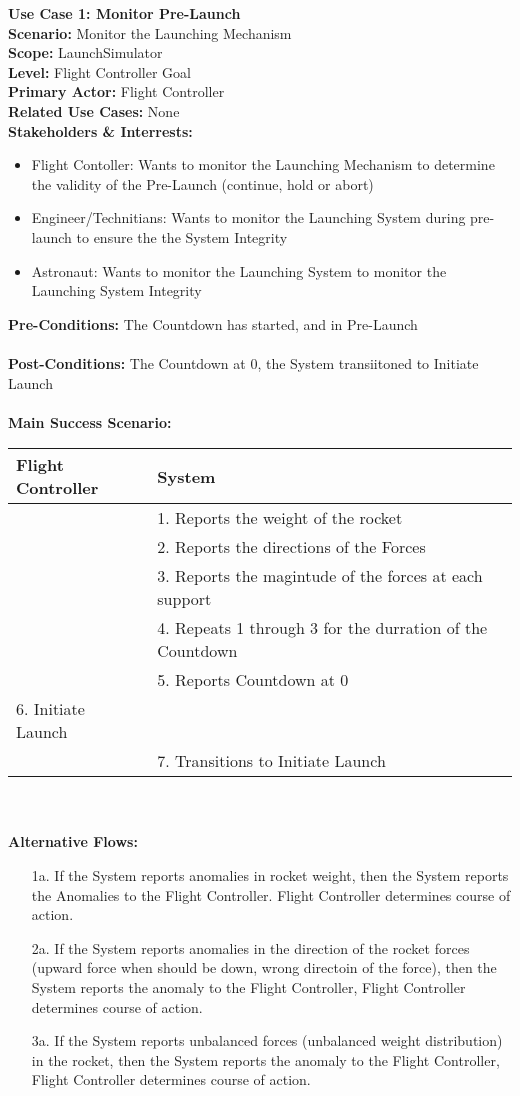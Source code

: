 \documentclass[letterpaper]{article}
\begin{document}
\noindent
\textbf{Use Case 1:  Monitor Pre-Launch}\\
\textbf{Scenario:  }Monitor the Launching Mechanism\\
\textbf{Scope:  }LaunchSimulator\\
\textbf{Level:  }Flight Controller Goal\\
\textbf{Primary Actor:  }Flight Controller\\
\textbf{Related Use Cases:  }None\\
\textbf{Stakeholders \& Interrests:}
\begin{itemize}
\item Flight Contoller:  Wants to monitor the Launching Mechanism to
determine the validity of the Pre-Launch (continue, hold or abort)
\item Engineer/Technitians:  Wants to monitor the Launching System 
during pre-launch to ensure the the System Integrity
\item Astronaut:  Wants to monitor the Launching System to monitor the
Launching System Integrity
\end{itemize}
\textbf{Pre-Conditions:  }The Countdown has started, and in
Pre-Launch\\\\
\textbf{Post-Conditions: }The Countdown at 0, the System transiitoned
to Initiate Launch\\\\
\textbf{Main Success Scenario:}\\
\begin{tabular}{|p{5.75cm}|p{5.75cm}|}\hline
\textbf{Flight Controller} & \textbf{System}\\\hline
& 1.  Reports the weight of the rocket\\\hline
& 2.  Reports the directions of the Forces\\\hline
& 3.  Reports the magintude of the forces at each support\\\hline
& 4.  Repeats 1 through 3 for the durration of the Countdown\\\hline
& 5.  Reports Countdown at 0\\\hline
6.  Initiate Launch &\\\hline
& 7.  Transitions to Initiate Launch\\\hline
\end{tabular}\\\\
\textbf{Alternative Flows:  }
\begin{itemize}
\item[1a.]If the System reports anomalies in rocket weight, then the
System reports the Anomalies to the Flight Controller.  Flight
Controller determines course of action.
\item[2a.]If the System reports anomalies in the direction of the
rocket forces (upward force when should be down, wrong directoin of the
force), then the System reports the anomaly to the Flight Controller,
Flight Controller determines course of action.
\item[3a.]If the System reports unbalanced forces (unbalanced weight
distribution) in the rocket, then the System reports the anomaly to the
Flight Controller, Flight Controller determines course of action.
\end{itemize}
\end{document}
